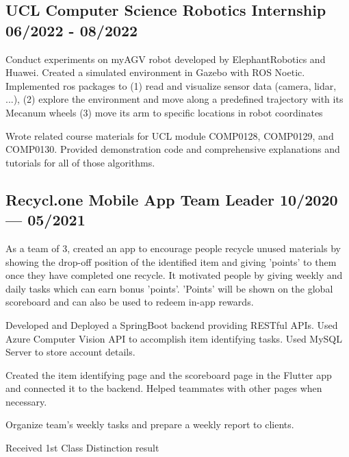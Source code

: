 \subsection*{{
    UCL Computer Science Robotics Internship
    \hfill 06/2022 - 08/2022
}}
\begin{zitemize}
    \item   Conduct experiments on myAGV robot developed by ElephantRobotics and Huawei.
            Created a simulated environment in Gazebo with ROS Noetic. 
            Implemented ros packages to (1) read and visualize sensor data (camera, lidar, ...),
            (2) explore the environment and move along a predefined trajectory with its Mecanum wheels
            (3) move its arm to specific locations in robot coordinates
    \item   Wrote related course materials for UCL module COMP0128, COMP0129, and COMP0130.
            Provided demonstration code and comprehensive explanations and tutorials for all of those algorithms.
\end{zitemize}


\subsection{{
    Recycl.one Mobile App Team Leader
    \hfill 10/2020 --- 05/2021
}}
\begin{zitemize}
    \item   As a team of 3, created an app to encourage people recycle unused materials by showing
            the drop-off position of the identified item and giving 'points' to them
            once they have completed one recycle. It motivated people by giving weekly and daily
            tasks which can earn bonus 'points'. 'Points' will be shown on the global scoreboard 
            and can also be used to redeem in-app rewards.  
    \item   Developed and Deployed a SpringBoot backend providing RESTful APIs.
            Used Azure Computer Vision API to accomplish item identifying tasks.
            Used MySQL Server to store account details. 
    \item   Created the item identifying page and the scoreboard page in the Flutter app and connected it
            to the backend. Helped teammates with other pages when necessary. 
    \item   Organize team's weekly tasks and prepare a weekly report to clients. 
    \item   Received 1st Class Distinction result
\end{zitemize}


